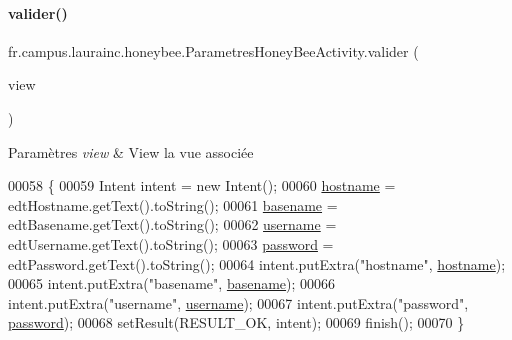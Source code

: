 \paragraph{\texorpdfstring{valider()}{valider()}}
{\footnotesize\ttfamily fr.\+campus.\+laurainc.\+honeybee.\+Parametres\+Honey\+Bee\+Activity.\+valider (\begin{DoxyParamCaption}\item[{View}]{view }\end{DoxyParamCaption})}


\begin{DoxyParams}{Paramètres}
{\em view} & View la vue associée \\
\hline
\end{DoxyParams}

\begin{DoxyCode}
00058     \{
00059         Intent intent = \textcolor{keyword}{new} Intent();
00060         \hyperlink{classfr_1_1campus_1_1laurainc_1_1honeybee_1_1_parametres_honey_bee_activity_abe6d58e55747fe47a9d440b925c50f0d}{hostname} = edtHostname.getText().toString();
00061         \hyperlink{classfr_1_1campus_1_1laurainc_1_1honeybee_1_1_parametres_honey_bee_activity_aaccd793d1d2883ca9471fe783915a9de}{basename} = edtBasename.getText().toString();
00062         \hyperlink{classfr_1_1campus_1_1laurainc_1_1honeybee_1_1_parametres_honey_bee_activity_a91b281cedd628be41899059c32a4fe03}{username} = edtUsername.getText().toString();
00063         \hyperlink{classfr_1_1campus_1_1laurainc_1_1honeybee_1_1_parametres_honey_bee_activity_a040c25d676f0391af65c55349575bc66}{password} = edtPassword.getText().toString();
00064         intent.putExtra(\textcolor{stringliteral}{"hostname"}, \hyperlink{classfr_1_1campus_1_1laurainc_1_1honeybee_1_1_parametres_honey_bee_activity_abe6d58e55747fe47a9d440b925c50f0d}{hostname});
00065         intent.putExtra(\textcolor{stringliteral}{"basename"}, \hyperlink{classfr_1_1campus_1_1laurainc_1_1honeybee_1_1_parametres_honey_bee_activity_aaccd793d1d2883ca9471fe783915a9de}{basename});
00066         intent.putExtra(\textcolor{stringliteral}{"username"}, \hyperlink{classfr_1_1campus_1_1laurainc_1_1honeybee_1_1_parametres_honey_bee_activity_a91b281cedd628be41899059c32a4fe03}{username});
00067         intent.putExtra(\textcolor{stringliteral}{"password"}, \hyperlink{classfr_1_1campus_1_1laurainc_1_1honeybee_1_1_parametres_honey_bee_activity_a040c25d676f0391af65c55349575bc66}{password});
00068         setResult(RESULT\_OK, intent);
00069         finish();
00070     \}
\end{DoxyCode}


